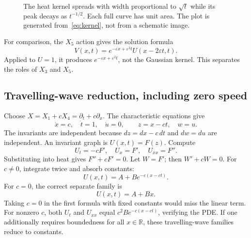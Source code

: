 \documentclass[11pt,a4paper]{article}
\numberwithin{equation}{section}
\theoremstyle{definition}
\theoremstyle{plain}
\theoremstyle{remark}
\newcommand{\R}{\mathbb R}
\begin{document}
\begin{figure}[htbp]\centering
{}
\caption{The heat kernel spreads with width proportional to $\sqrt t$ while its peak decays as $t^{-1/2}$. Each full curve has unit area. The plot is generated from~\eqref{eq:kernel}, not from a schematic image.}
\end{figure}

For comparison, the $X_5$ action gives the solution formula
\[
V(x,t)=e^{-\varepsilon x+\varepsilon^2t}U(x-2\varepsilon t,t).
\]
Applied to $U=1$, it produces $e^{-\varepsilon x+\varepsilon^2t}$, not the Gaussian kernel. This separates the roles of $X_3$ and $X_5$.

\subsection{Travelling-wave reduction, including zero speed}
Choose $X=X_1+cX_4=\partial_t+c\partial_x$. The characteristic equations give
\[
\dot x=c,\quad\dot t=1,\quad\dot u=0,
\qquad z=x-ct,\quad w=u.
\]
The invariants are independent because $dz=dx-c\,dt$ and $dw=du$ are independent. An invariant graph is $U(x,t)=F(z)$. Compute
\[
U_t=-cF',\quad U_x=F',\quad U_{xx}=F''.
\]
Substituting into heat gives $F''+cF'=0$. Let $W=F'$; then $W'+cW=0$. For $c\ne0$, integrate twice and absorb constants:
\[
\boxed{U(x,t)=A+B e^{-c(x-ct)}.}
\]
For $c=0$, the correct separate family is
\[
\boxed{U(x,t)=A+Bx.}
\]
Taking $c=0$ in the first formula with fixed constants would miss the linear term. For nonzero $c$, both $U_t$ and $U_{xx}$ equal $c^2B e^{-c(x-ct)}$, verifying the PDE. If one additionally requires boundedness for all $x\in\R$, these travelling-wave families reduce to constants.
\end{document}
